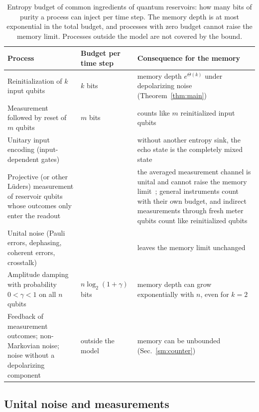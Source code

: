 \documentclass[aps,prl,twocolumn,superscriptaddress,floatfix]{revtex4-2}
\theoremstyle{plain}
\begin{document}
\begin{table}[t]
\caption{Entropy budget of common ingredients of quantum reservoirs: how many bits of purity a process can inject per time step. The memory depth is at most exponential in the total budget, and processes with zero budget cannot raise the memory limit. Processes outside the model are not covered by the bound.}
\label{tabS:budget}
\begin{ruledtabular}
\begin{tabular}{>{\raggedright\arraybackslash}p{5.3cm}>{\raggedright\arraybackslash}p{2.7cm}>{\raggedright\arraybackslash}p{8.3cm}}
Process & Budget per time step & Consequence for the memory \\ \hline
Reinitialization of $k$ input qubits & $k$ bits & memory depth $e^{\Theta(k)}$ under depolarizing noise (Theorem~\ref{thm:main}) \\
Measurement followed by reset of $m$ qubits & $m$ bits & counts like $m$ reinitialized input qubits~\cite{Yasuda2023,Hu2024} \\
Unitary input encoding (input-dependent gates) & 0 & without another entropy sink, the echo state is the completely mixed state \\
Projective (or other L\"uders) measurement of reservoir qubits whose outcomes only enter the readout & 0 & the averaged measurement channel is unital and cannot raise the memory limit~\cite{Mujal2023}; general instruments count with their own budget, and indirect measurements through fresh meter qubits count like reinitialized qubits~\cite{MorguiSancho2026} \\
Unital noise (Pauli errors, dephasing, coherent errors, crosstalk) & 0 & leaves the memory limit unchanged \\
Amplitude damping with probability $0<\gamma<1$ on all $n$ qubits & $n\log_2(1+\gamma)$ bits & memory depth can grow exponentially with $n$, even for $k=2$~\cite{BenOr2013,Monzani2024,Freiheit2026} \\
Feedback of measurement outcomes; non-Markovian noise; noise without a depolarizing component & outside the model & memory can be unbounded (Sec.~\ref{sm:counter})~\cite{Sannia2026} \\
\end{tabular}
\end{ruledtabular}
\end{table}

\subsection{Unital noise and measurements}
\end{document}
